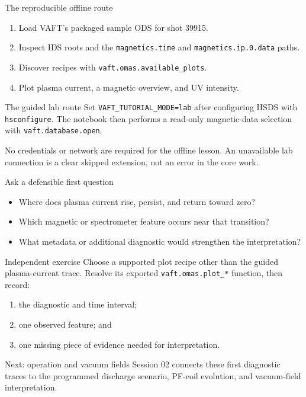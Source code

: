 \documentclass[aspectratio=169]{beamer}
\begin{document}
\begin{frame}{The reproducible offline route}
  \begin{enumerate}
    \item Load VAFT's packaged sample ODS for shot 39915.
    \item Inspect IDS roots and the \texttt{magnetics.time} and
      \texttt{magnetics.ip.0.data} paths.
    \item Discover recipes with \texttt{vaft.omas.available\_plots}.
    \item Plot plasma current, a magnetic overview, and UV intensity.
  \end{enumerate}
\end{frame}

\begin{frame}{The guided lab route}
  Set \texttt{VAFT\_TUTORIAL\_MODE=lab} after configuring HSDS with
  \texttt{hsconfigure}. The notebook then performs a read-only magnetic-data
  selection with \texttt{vaft.database.open}.
  \vspace{0.7em}

  No credentials or network are required for the offline lesson. An unavailable
  lab connection is a clear skipped extension, not an error in the core work.
\end{frame}

\begin{frame}{Ask a defensible first question}
  \begin{itemize}
    \item Where does plasma current rise, persist, and return toward zero?
    \item Which magnetic or spectrometer feature occurs near that transition?
    \item What metadata or additional diagnostic would strengthen the interpretation?
  \end{itemize}
\end{frame}

\begin{frame}{Independent exercise}
  Choose a supported plot recipe other than the guided plasma-current trace.
  Resolve its exported \texttt{vaft.omas.plot\_*} function, then record:
  \begin{enumerate}
    \item the diagnostic and time interval;
    \item one observed feature; and
    \item one missing piece of evidence needed for interpretation.
  \end{enumerate}
\end{frame}

\begin{frame}{Next: operation and vacuum fields}
  Session 02 connects these first diagnostic traces to the programmed discharge
  scenario, PF-coil evolution, and vacuum-field interpretation.
\end{frame}
\end{document}
